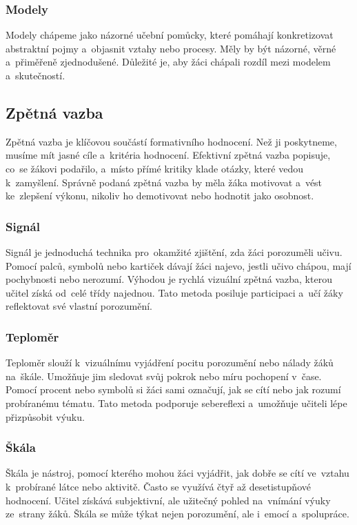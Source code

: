 \documentclass[male,czech,api_bc]{kitheses}
\begin{document}
\subsubsection{Modely}

Modely chápeme jako názorné učební pomůcky, které pomáhají konkretizovat abstraktní pojmy a~objasnit vztahy nebo procesy. Měly by být názorné, věrné a~přiměřeně zjednodušené. Důležité je, aby žáci chápali rozdíl mezi modelem a~skutečností.

\subsection{Zpětná vazba}

Zpětná vazba je klíčovou součástí formativního hodnocení. Než ji poskytneme, musíme mít jasné cíle a~kritéria hodnocení. Efektivní zpětná vazba popisuje, co~se žákovi podařilo, a~místo přímé kritiky klade otázky, které vedou k~zamyšlení. Správně podaná zpětná vazba by měla žáka motivovat a~vést ke~zlepšení výkonu, nikoliv ho demotivovat nebo hodnotit jako osobnost.

\subsubsection{Signál}

Signál je jednoduchá technika pro~okamžité zjištění, zda žáci porozuměli učivu. Pomocí palců, symbolů nebo kartiček dávají žáci najevo, jestli učivo chápou, mají pochybnosti nebo nerozumí. Výhodou je rychlá vizuální zpětná vazba, kterou učitel získá od~celé třídy najednou. Tato metoda posiluje participaci a~učí žáky reflektovat své vlastní porozumění.

\subsubsection{Teploměr}

Teploměr slouží k~vizuálnímu vyjádření pocitu porozumění nebo nálady žáků na~škále. Umožňuje jim sledovat svůj pokrok nebo míru pochopení v~čase. Pomocí procent nebo symbolů si žáci sami označují, jak se cítí nebo jak rozumí probíranému tématu. Tato metoda podporuje sebereflexi a~umožňuje učiteli lépe přizpůsobit výuku.

\subsubsection{Škála}

Škála je nástroj, pomocí kterého mohou žáci vyjádřit, jak dobře se cítí ve~vztahu k~probírané látce nebo aktivitě. Často se využívá čtyř až desetistupňové hodnocení. Učitel získává subjektivní, ale užitečný pohled na~vnímání výuky ze~strany žáků. Škála se může týkat nejen porozumění, ale i~emocí a~spolupráce.
\end{document}
